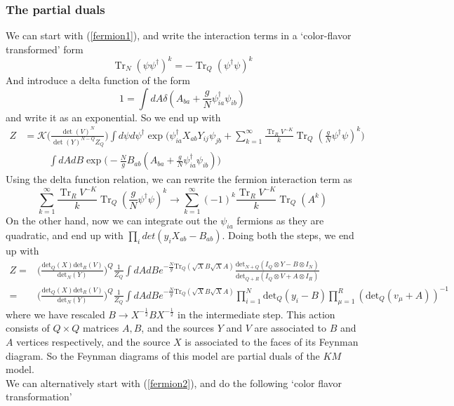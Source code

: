 \documentclass[english]{article}
\DeclareMathOperator{\Tr}{Tr}
\newcommand\be{\begin{equation}}
\newcommand\ee{\end{equation}}
\newcommand{\half}{\frac{1}{2}}
\renewcommand{\>}{\rangle}
\newcommand{\<}{\langle}
\newcommand{\de}{\delta}
\newcommand{\dg}{\dagger}
\renewcommand{\(}{\left(}
\renewcommand{\)}{\right)}
\newcommand{\psid}{\psi^{\dg}}
\begin{document}
\subsubsection*{The partial duals}
We can start with (\ref{fermion1}), and write the interaction terms in a `color-flavor transformed' form \cite{AltlandSonner2020, Altland2022,goel2021string}
\be 
\Tr_N(\psi\psid)^k = - \Tr_Q(\psid\psi)^k
\ee 
And introduce a delta function of the form
\be 
1 = \int dA \de (A_{ba} + \frac{g}{N}\psid_{ia}\psi_{ib})
\ee 
and write it as an exponential. So we end up with 
\be 
\begin{split}
    Z&=\mathcal{K}\bigg(\frac{\det(V)^N}{\det(Y)^{N-Q} Z_{Q}}\bigg)\int d\psi d\psi^{\dagger}\exp\bigg(\psi^{\dagger}_{ia}X_{ab}Y_{ij}\psi_{jb}+ \sum_{k=1}^{\infty}\frac{\Tr_{R}V^{-K}}{k}\Tr_Q(\frac{g}{N}\psid\psi)^k\bigg)\\
    &\hspace{30pt}\int dA dB \exp\bigg( -\frac{N}{g} B_{ab}(A_{ba} + \frac{g}{N}\psid_{ia}\psi_{ib}) \bigg)
\end{split}
\ee 
Using the delta function relation, we can rewrite the fermion interaction term as 
\be 
 \sum_{k=1}^{\infty}\frac{\Tr_{R}V^{-K}}{k}\Tr_Q(\frac{g}{N}\psid\psi)^k \to \sum_{k=1}^{\infty}(-1)^{k}\frac{\Tr_{R}V^{-K}}{k} \Tr_Q(A^k) 
\ee 
On the other hand, now we can integrate out the $\psi_{ia}$ fermions as they are quadratic, and end up with $\prod_{i}det(y_i X_{ab} - B_{ab})$. Doing both the steps, we end up with  
\begin{align}\label{AB model}
    Z=&\bigg( \frac{\text{det}_{Q}(X) \text{det}_{R}(V)}{\text{det}_N(Y)}\bigg)^{Q}\frac{1}{Z_Q}\int dA d B e^{-\frac{N}{g}\text{Tr}_Q(\sqrt{X}B\sqrt{X} A)} \frac{\text{det}_{N+Q}(I_{Q}\otimes Y -B\otimes I_{N})}{ \text{det}_{Q+R} (I_{Q}\otimes V + A\otimes I_{R})}\\
    =&\bigg( \frac{\text{det}_{Q}(X) \text{det}_{R}(V)}{\text{det}_N(Y)}\bigg)^{Q}\frac{1}{Z_Q}\int dA dB e^{-\frac{N}{g}\text{Tr}_Q(\sqrt{X}B\sqrt{X} A)} \prod_{i=1}^N\text{det}_Q(y_i-B)\prod_{\mu=1}^R(\text{det}_Q(v_{\mu}+A))^{-1}
\end{align}
where we have rescaled $B \to X^{-\half}BX^{-\half}$ in the intermediate step. This action consists of $Q\times Q$ matrices $A, B$, and the sources $Y$ and $V$ are associated to $B$ and $A$ vertices respectively, and the source $X$ is associated to the faces of its Feynman diagram. So the Feynman diagrams of this model are partial duals of the $KM$ model. \\
We can alternatively start with (\ref{fermion2}), and do the following `color flavor transformation'
\end{document}
